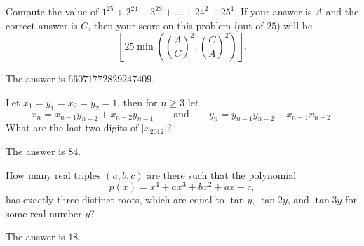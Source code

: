 \documentclass[11pt]{article}
\theoremstyle{definition}
\begin{document}
%	







\begin{question}[name={2013 HMMT, Guts, \href{https://artofproblemsolving.com/community/c129h526573p2986253}{Problem 33}}]
	Compute the value of $1^{25}+2^{24}+3^{23}+\ldots+24^2+25^1$. If your answer is $A$ and the correct answer is $C$, then your score on this problem (out of $25$) will be $$\left\lfloor25\min\left(\left(\frac AC\right)^2,\left(\frac CA\right)^2\right)\right\rfloor.$$
\end{question}




\begin{solution}
	The answer is $\boxed{66071772829247409}$.
\end{solution}









\begin{question}[name={2012 HMMT, Algebra, \href{https://artofproblemsolving.com/community/c129h521066p2934967}{Problem 8}}]
	Let $x_1=y_1=x_2=y_2=1$, then for $n\geq 3$ let $$x_n=x_{n-1}y_{n-2}+x_{n-2}y_{n-1} \qquad \text{and}\qquad y_n=y_{n-1}y_{n-2}-x_{n-1}x_{n-2}.$$ What are the last two digits of $|x_{2012}|$?
\end{question}




\begin{solution}
	The answer is $\boxed{84}$.
\end{solution}







\begin{question}[name={2012 HMMT, Algebra, \href{https://artofproblemsolving.com/community/c129h521067p2934968}{Problem 9}}]
	How many real triples $(a,b,c)$ are there such that the polynomial $$p(x)=x^4+ax^3+bx^2+ax+c,$$ has exactly three distinct roots, which are equal to $\tan y$, $\tan 2y$, and $\tan 3y$ for some real number $y$?	
\end{question}




\begin{solution}
	The answer is $\boxed{18}$.
\end{solution}
\end{document}
